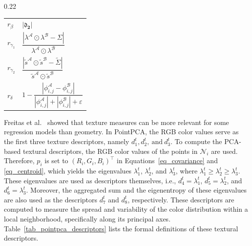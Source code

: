 \documentclass[final,3p,times,twocolumn]{elsarticle}
\begin{document}
\begin{table}[ht!]
\begin{subtable}[t]{0.22\textwidth}
{\begin{tabular}{ll}
    \addlinespace
    $r_\beta$ & $\left| \mathbf{\mathfrak{d}_2} \right|$ \\
    \addlinespace
    $r_{\gamma_1}$ & $\dfrac{|\lambda^\mathcal{A} \odot \lambda^\mathcal{B} - \Sigma|}{\lambda^\mathcal{A} \odot \lambda^\mathcal{B}}$ \\
    \addlinespace
    $r_{\gamma_2}$ & $\dfrac{|\tilde{s}^\mathcal{A} \odot \tilde{s}^\mathcal{B} - \tilde{\Sigma}|}{\tilde{s}^\mathcal{A} \odot \tilde{s}^\mathcal{B}}$ \\
    \addlinespace
    $r_{\delta}$ & $1 - \dfrac{|\phi_{i,j}^\mathcal{A} - \phi_{i,j}^\mathcal{B}|}{|\phi_{i,j}^\mathcal{A}| + |\phi_{i,j}^\mathcal{B}| + \varepsilon}$ \\
    \bottomrule
    \end{tabular}
    }
  \end{subtable}

\end{table}



Freitas et al.~\cite{freitas2023point} showed that texture measures can be more relevant for some regression models than geometry. In PointPCA, the RGB color values serve as the first three texture descriptors, namely $d_{1}^t, d_{2}^t, ~\text{and}~ d_{3}^t$. To compute the PCA-based textural descriptors, the RGB color values of the points in $\mathcal{N}_i$ are used. Therefore, $p_i$ is set to $(R_i, G_i, B_i)^\top$  in Equations~\ref{eq_covariance} and \ref{eq_centroid}, which yields the eigenvalues  $\lambda_1^t$, 
$\lambda_2^t$, and $\lambda_3^t$, where $\lambda_1^t \geq \lambda_2^t \geq \lambda_3^t$. These eigenvalues are used as descriptors themselves, i.e., $d_4^t=\lambda_1^t$, $d_5^t=\lambda_2^t$, and $d_6^t=\lambda_3^t$. Moreover, the aggregated sum and the eigenentropy of these eigenvalues are also used as the descriptors $d_{7}^t$ and $d_{8}^t$, respectively. These descriptors are computed to measure the spread and variability of the color distribution within a local neighborhood, specifically along its principal axes. Table~\ref{tab_pointpca_descriptors} lists the formal definitions of these textural descriptors.
 
\end{document}
